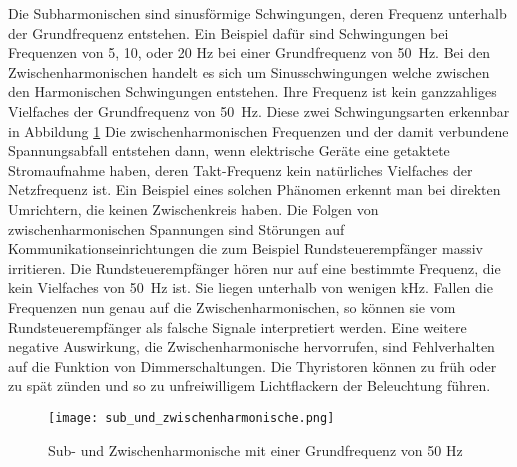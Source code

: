 Die Subharmonischen sind sinusförmige Schwingungen, deren Frequenz unterhalb der Grundfrequenz entstehen. Ein Beispiel dafür sind Schwingungen bei Frequenzen von 5, 10, oder 20 Hz bei einer Grundfrequenz von \SI{50}{Hz}. Bei den Zwischenharmonischen handelt es sich um Sinusschwingungen welche zwischen den Harmonischen Schwingungen entstehen. Ihre Frequenz ist kein ganzzahliges Vielfaches der Grundfrequenz von \SI{50}{Hz}. Diese zwei Schwingungsarten erkennbar in Abbildung \ref{fig:Sub und Zwischenharmonische} Die zwischenharmonischen Frequenzen und der damit verbundene Spannungsabfall entstehen dann, wenn elektrische Geräte eine getaktete Stromaufnahme haben, deren Takt-Frequenz kein natürliches Vielfaches der Netzfrequenz ist. Ein Beispiel eines solchen Phänomen erkennt man bei direkten Umrichtern, die keinen Zwischenkreis haben. Die Folgen von zwischenharmonischen Spannungen sind Störungen auf Kommunikationseinrichtungen die zum Beispiel Rundsteuerempfänger massiv irritieren. Die Rundsteuerempfänger hören nur auf eine bestimmte Frequenz, die kein Vielfaches von \SI{50}{Hz} ist. Sie liegen unterhalb von wenigen kHz. Fallen die Frequenzen nun genau auf die Zwischenharmonischen, so können sie vom Rundsteuerempfänger als falsche Signale interpretiert werden. Eine weitere negative Auswirkung, die Zwischenharmonische hervorrufen, sind Fehlverhalten auf die Funktion von Dimmerschaltungen. Die Thyristoren können zu früh oder zu spät zünden und so zu unfreiwilligem Lichtflackern der Beleuchtung führen. 

\begin{figure}[ht!]
	\centering
	\texttt{[image: sub\_und\_zwischenharmonische.png]}	
	\caption{Sub- und Zwischenharmonische mit einer Grundfrequenz von 50 Hz}
	\label{fig:Sub und Zwischenharmonische}
\end{figure}

\newpage
